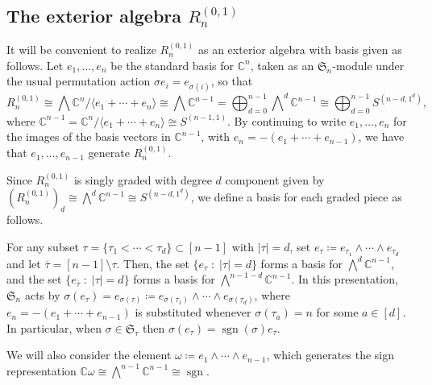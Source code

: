 \documentclass[11pt, reqno]{amsart}
\theoremstyle{definition}
\theoremstyle{remark}
\numberwithin{equation}{section}
\newcommand{\0}{\emptyset}
\newcommand{\C}{\mathbb{C}}
\renewcommand{\S}{\mathfrak{S}}
\DeclareMathOperator{\sgn}{sgn}
\begin{document}
\subsection{The exterior algebra \texorpdfstring{$R_n^{(0,1)}$}{Rn(0,1)}}\label{subsec:Rn(0,1)}

It will be convenient to realize $R_n^{(0,1)}$ as an exterior algebra with basis given as follows. 
Let $e_1,\ldots,e_{n}$ be the standard basis for $\C^{n}$, taken as an $\S_n$-module under the usual permutation action $\sigma e_i = e_{\sigma(i)}$, so that
\begin{equation} \label{eq:R(0,1)=hooks}
R_n^{(0,1)} \cong \bigwedge \C^n / \langle e_1+\cdots +e_n\rangle
\cong \bigwedge \C^{n-1} = \bigoplus_{d=0}^{n-1} \bigwedge\nolimits^d \C^{n-1} \cong \bigoplus_{d=0}^{n-1} S^{(n-d,1^d)}, 
\end{equation}
where $\C^{n-1} = \C^n /\langle e_1 + \cdots + e_n\rangle \cong S^{(n-1,1)}$. By continuing to write $e_1, \ldots, e_n$ for the images of the basis vectors in $\C^{n-1}$, with $e_n= -(e_1+ \cdots +e_{n-1})$, we have that $e_1,\ldots, e_{n-1}$ generate $R_n^{(0,1)}$. 

Since $R_n^{(0,1)}$ is singly graded with degree $d$ 
component given by $\left(R_n^{(0,1)}\right)_d \cong \bigwedge^d \C^{n-1} \cong S^{(n-d,1^d)}$, we define a basis for each graded piece as follows. 

For any subset $\tau = \{ \tau_1<\cdots<\tau_d\} \subset [n-1]$ 
with $|\tau|=d$, set 
$e_\tau \coloneqq e_{\tau_1} \wedge \cdots \wedge e_{\tau_d}$ and let $\overline{\tau}= [n-1]\setminus \tau$.  Then, the set $\{ e_{\tau} \;:\; |\tau|=d\}$ forms a basis for $\bigwedge^d\C^{n-1}$, and the set $\{ e_{\overline{\tau}} \;:\; |\tau|=d\}$ forms a basis for $\bigwedge^{n-1-d}\C^{n-1}$. 
In this presentation, $\S_n$ acts by $\sigma(e_\tau) = e_{\sigma(\tau)}\coloneqq e_{\sigma(\tau_1)} \wedge \cdots \wedge e_{\sigma(\tau_d)} $, where $e_n = -(e_1 + \cdots + e_{n-1})$ is substituted whenever $\sigma(\tau_a) = n$ for some $a \in [d]$. In particular, when $\sigma \in \S_\tau$ then $\sigma(e_\tau) = \sgn(\sigma) e_\tau$.

We will also consider the element $\omega \coloneqq e_1\wedge \cdots \wedge e_{n-1}$, which generates the sign representation 
$\C \omega \cong \bigwedge^{n-1}\C^{n-1} \cong  \sgn.$
\end{document}

